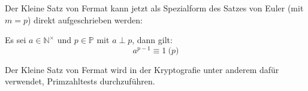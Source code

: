 \noindent
Der Kleine Satz von Fermat kann jetzt als Spezialform des Satzes von Euler (mit $m = p$) direkt
aufgeschrieben werden:

\begin{satz}
  \label{satz:kleiner-fermat}
  Es sei $a \in \mathbb{N}^\times$ und $p \in \mathbb{P}$ mit $a \perp p$, dann gilt:
  \begin{equation*}
    a^{p-1} \equiv 1 \pod{p}
  \end{equation*}
\end{satz}

\noindent
Der Kleine Satz von Fermat wird in der Kryptografie unter anderem dafür verwendet,
Primzahltests durchzuführen.